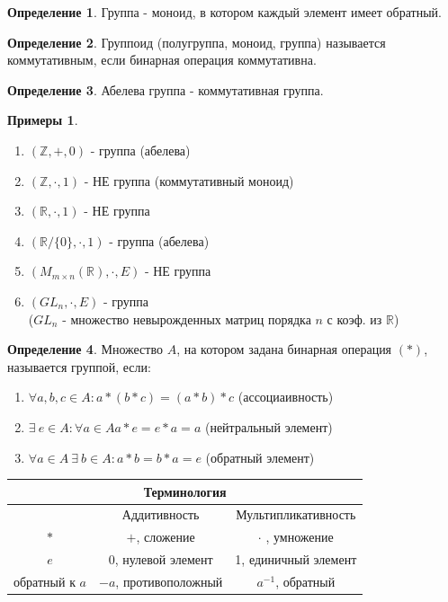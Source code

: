 \documentclass[a4paper, 12pt]{article}
\newcommand{\R}{\mathbb R}
\newcommand{\Z}{\mathbb Z}
\newcommand\tab[1][.5cm]{\hspace*{#1}}
\theoremstyle{definition}
\newtheorem*{definition}{Определение}
\newtheorem*{example}{Примеры}
\begin{document}
  \begin{definition}
    Группа - моноид, в котором каждый элемент имеет обратный.
  \end{definition}
  \begin{definition}
    Группоид (полугруппа, моноид, группа) называется коммутативным, если бинарная операция коммутативна.
  \end{definition} 
  \begin{definition}
    Абелева группа - коммутативная группа. 
  \end{definition}
  \begin{example}
    \begin{enumerate} \tab
      \item $(\Z, +, 0)$ - группа (абелева)
      \item $(\Z, \cdot, 1)$ - НЕ группа (коммутативный моноид)
      \item $(\R, \cdot, 1)$ - НЕ группа
      \item $(\R/\{0\}, \cdot, 1)$ - группа (абелева)
      \item $(M_{m \times n}(\R), \cdot, E)$ - НЕ группа
      \item $(GL_n, \cdot, E)$ - группа \\($GL_n$ - множество невырожденных матриц порядка $n$ с коэф. из $\R$)
    \end{enumerate}
  \end{example} 
  \begin{definition}
    Множество $A$, на котором задана бинарная операция $(*)$, называется группой, если:
    \begin{enumerate}
      \item  $\forall a,b,c \in A: a*(b*c)=(a*b)*c$ (ассоциаивность)
      \item $\exists \ e \in A: \forall a \in A a*e = e*a = a$ (нейтральный элемент)
      \item $\forall a \in A \ \exists \ b \in A: a*b = b*a = e $ (обратный элемент)
    \end{enumerate}
  \end{definition} 
  \vspace{5pt}
  \begin{center}
    \begin{tabular}{|c|c|c|}
      \hline \multicolumn{3}{|c|}{\textbf{Терминология} } \\ \hline
      \null & Аддитивность & Мультипликативность \\ \hline
      $*$ & $+$, сложение & $\cdot$ , умножение \\ \hline
      $e$ & 0, нулевой элемент & 1, единичный элемент \\ \hline
      обратный к $a$ & $-a$, противоположный & $a^{-1}$, обратный \\ \hline
    \end{tabular}
  \end{center}
  \vspace{5pt}
\end{document}
